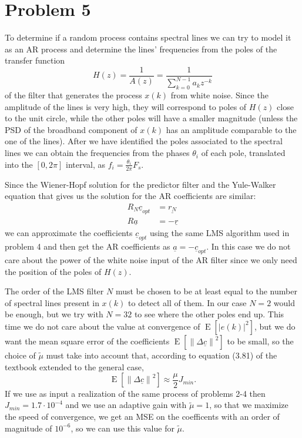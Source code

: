 \documentclass{article}
\renewcommand{\vec}[1]{\underline{#1}}
\newcommand{\E}[1]{\operatorname{E}\left[#1\right]}
\newcommand{\norm}[1]{\left\lVert#1\right\rVert}
\newcommand{\abs}[1]{\left|#1\right|}
\begin{document}
\section*{Problem 5}
To determine if a random process contains spectral lines we can try to
model it as an AR process and determine the lines' frequencies from
the poles of the transfer function
\[ H(z) = \frac{1}{A(z)} = \frac{1}{\sum_{k=0}^{N-1}a_kz^{-k}} \]
of the filter that generates the process $x(k)$ from white
noise. Since the amplitude of the lines is very high, they will
correspond to poles of $H(z)$ close to the unit circle, while the
other poles will have a smaller magnitude (unless the PSD of the
broadband component of $x(k)$ has an amplitude comparable to the one
of the lines). After we have identified the poles associated to the
spectral lines we can obtain the frequencies from the phases
$\theta_i$ of each pole, translated into the $[0,2\pi]$ interval, as
$f_i = \frac{\theta_i}{2\pi}F_s$.

Since the Wiener-Hopf solution for the predictor filter and the
Yule-Walker equation that gives us the solution for the AR coefficients
are similar:
\begin{align*}
  R_N\vec{c}_{opt} &= \vec{r_N} \\
  R\vec{a} &= -\vec{r}
\end{align*}
we can approximate the coefficients $\vec{c}_{opt}$ using the same LMS
algorithm used in problem 4 and then get the AR coefficients as $
\vec{a} = -\vec{c}_{opt}$. In this case we do not care about the power
of the white noise input of the AR filter since we only need the
position of the poles of $H(z)$.

The order of the LMS filter $N$ must be chosen to be at least equal to
the number of spectral lines present in $x(k)$ to detect all of
them. In our case $N=2$ would be enough, but we try with $N=32$ to see
where the other poles end up. This time we do not care about the value
at convergence of $\E{\abs{e(k)}^2}$, but we do want the mean square
error of the coefficients $ \E{\norm{\Delta\vec{c}}^2} $ to be small,
so the choice of $\tilde{\mu}$ must take into account that, according
to equation (3.81) of the textbook extended to the general case, 
\[ \E{\norm{\Delta\vec{c}}^2} \approx \frac{\mu}{2}J_{min} . \]
If we use as input a realization of the same process of problems 2-4
then $J_{min} = 1.7\cdot10^{-4}$ and we use an adaptive gain with
$\tilde{\mu} = 1$, so that we maximize the speed of convergence, we
get an MSE on the coefficents with an order of magnitude of $10^{-6}$,
so we can use this value for $\tilde{\mu}$.
\end{document}
